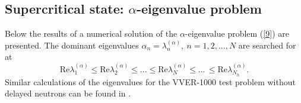 \documentclass[a4paper]{jpconf}
\begin{document}
%

\subsection{Supercritical state: $\alpha$-eigenvalue problem} 

Below the results of a numerical solution of the $\alpha$-eigenvalue problem (\ref{9}) are presented. 
The dominant eigenvalues $\alpha_n = \lambda_n^{(\alpha)}, \ n = 1,2, ..., N$ are searched for at
\[
 \mathrm{Re}  \lambda_1^{(\alpha)} \leq  \mathrm{Re}  \lambda_2^{(\alpha)} \leq ... 
 \leq \mathrm{Re}  \lambda_N^{(\alpha)} \leq ...\, \leq \mathrm{Re}  \lambda_{N_h}^{(\alpha)}.
\]
Similar calculations of the eigenvalues for the VVER-1000 test problem without delayed neutrons can be found in \cite{avvakumov2017spectral}. 
\end{document}
